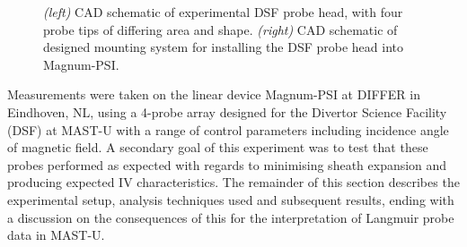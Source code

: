 \documentclass[a4paper, 12pt]{article} %
\begin{document}
	\begin{figure}
		\vspace{-10pt}
		\centering
		\caption{\label{fig:dsfprobe}\textit{(left)} CAD schematic of experimental DSF probe head, with four probe tips of differing area and shape. \textit{(right)} CAD schematic of designed mounting system for installing the DSF probe head into Magnum-PSI.}
		\vspace{-10pt}
	\end{figure}
	Measurements were taken on the linear device Magnum-PSI at DIFFER in Eindhoven, NL, using a 4-probe array designed for the Divertor Science Facility (DSF) at MAST-U with a range of control parameters including incidence angle of magnetic field. 
	A secondary goal of this experiment was to test that these probes performed as expected with regards to minimising sheath expansion and producing expected IV characteristics.
	The remainder of this section describes the experimental setup, analysis techniques used and subsequent results, ending with a discussion on the consequences of this for the interpretation of Langmuir probe data in MAST-U.
\end{document}
